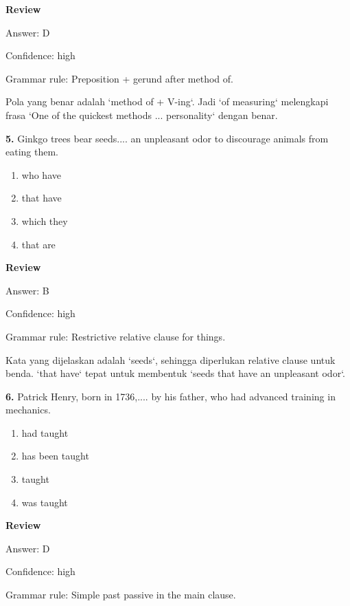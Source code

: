 \documentclass[12pt]{article}
\begin{document}
\textbf{Review}\par
Answer: D\par
Confidence: high\par
Grammar rule: Preposition + gerund after method of.\par
Pola yang benar adalah `method of + V-ing`. Jadi `of measuring` melengkapi frasa `One of the quickest methods ... personality` dengan benar.\par
\endgroup
\par
\vspace{0.25\baselineskip}
\noindent\textbf{5.} Ginkgo trees bear seeds.... an unpleasant odor to discourage animals from eating them.
\begin{enumerate}[label=(\Alph*),leftmargin=*,itemsep=0.2em]
\item who have
\item that have
\item which they
\item that are
\end{enumerate}
\par
\begingroup
\setlength{\parskip}{0pt}
\setlength{\parindent}{0pt}
\textbf{Review}\par
Answer: B\par
Confidence: high\par
Grammar rule: Restrictive relative clause for things.\par
Kata yang dijelaskan adalah `seeds`, sehingga diperlukan relative clause untuk benda. `that have` tepat untuk membentuk `seeds that have an unpleasant odor`.\par
\endgroup
\par
\vspace{0.25\baselineskip}
\noindent\textbf{6.} Patrick Henry, born in 1736,.... by his father, who had advanced training in mechanics.
\begin{enumerate}[label=(\Alph*),leftmargin=*,itemsep=0.2em]
\item had taught
\item has been taught
\item taught
\item was taught
\end{enumerate}
\par
\begingroup
\setlength{\parskip}{0pt}
\setlength{\parindent}{0pt}
\textbf{Review}\par
Answer: D\par
Confidence: high\par
Grammar rule: Simple past passive in the main clause.\par
\end{document}
